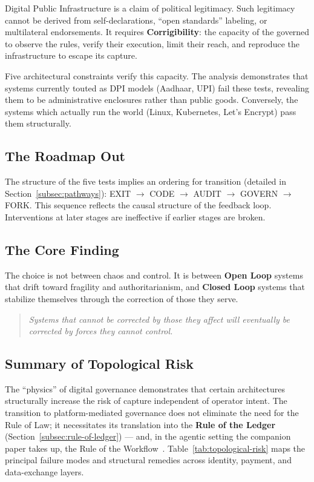 \documentclass{article}
\begin{document}
Digital Public Infrastructure is a claim of political legitimacy. Such legitimacy cannot be derived from self-declarations, ``open standards'' labeling, or multilateral endorsements. It requires \textbf{Corrigibility}: the capacity of the governed to observe the rules, verify their execution, limit their reach, and reproduce the infrastructure to escape its capture.

Five architectural constraints verify this capacity. The analysis demonstrates that systems currently touted as DPI models (Aadhaar, UPI) fail these tests, revealing them to be administrative enclosures rather than public goods. Conversely, the systems which actually run the world (Linux, Kubernetes, Let's Encrypt) pass them structurally.

\subsection{The Roadmap Out}

The structure of the five tests implies an ordering for transition (detailed in Section~\ref{subsec:pathways}): EXIT $\to$ CODE $\to$ AUDIT $\to$ GOVERN $\to$ FORK. This sequence reflects the causal structure of the feedback loop. Interventions at later stages are ineffective if earlier stages are broken.

\subsection{The Core Finding}

The choice is not between chaos and control. It is between \textbf{Open Loop} systems that drift toward fragility and authoritarianism, and \textbf{Closed Loop} systems that stabilize themselves through the correction of those they serve.

\begin{quote}
\textit{Systems that cannot be corrected by those they affect will eventually be corrected by forces they cannot control.}
\end{quote}

\subsection{Summary of Topological Risk}

The ``physics'' of digital governance demonstrates that certain architectures structurally increase the risk of capture independent of operator intent. The transition to platform-mediated governance does not eliminate the need for the Rule of Law; it necessitates its translation into the \textbf{Rule of the Ledger} (Section~\ref{subsec:rule-of-ledger}) --- and, in the agentic setting the companion paper takes up, the Rule of the Workflow~\citep{aravind2026epi}. Table~\ref{tab:topological-risk} maps the principal failure modes and structural remedies across identity, payment, and data-exchange layers.
\end{document}
